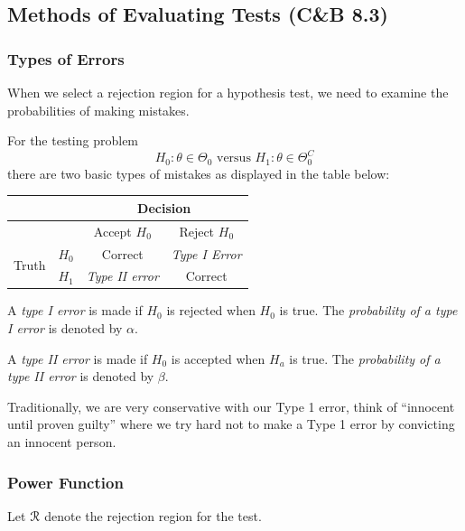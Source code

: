 \documentclass[11pt,]{article}
\def\Rsc{{\cal R}}
\begin{document}
\newpage

\hypertarget{methods-of-evaluating-tests-cb-8.3}{%
\subsection{Methods of Evaluating Tests (C\&B
8.3)}\label{methods-of-evaluating-tests-cb-8.3}}

\hypertarget{types-of-errors}{%
\subsubsection{Types of Errors}\label{types-of-errors}}

When we select a rejection region for a hypothesis test, we need to
examine the probabilities of making mistakes.

For the testing problem
\[H_0: \theta \in \Theta_0 \mbox{ versus } H_1: \theta \in \Theta_0^C\]
there are two basic types of mistakes as displayed in the table below:

\begin{tabular}{|c|c|c|c|}\hline
  \multicolumn{2}{|c|}{}  & \multicolumn{2}{c|}{Decision}  \\\hline 
  \multicolumn{2}{|c|}{}  & Accept $H_0$ & Reject $H_0$ \\\hline 
\multirow{ 2}{*}{Truth} & $H_0$ & Correct & {\em Type I Error} \\
  & $H_1$ & {\em Type II error} & Correct\\\hline
  \end{tabular}

A \emph{type I error} is made if \(H_0\) is rejected when \(H_0\) is
true. The \emph{probability of a type I error} is denoted by \(\alpha\).

A \emph{type II error} is made if \(H_0\) is accepted when \(H_a\) is
true. The \emph{probability of a type II error} is denoted by \(\beta\).

Traditionally, we are very conservative with our Type 1 error, think of
``innocent until proven guilty'' where we try hard not to make a Type 1
error by convicting an innocent person.

\hypertarget{power-function}{%
\subsubsection{Power Function}\label{power-function}}

Let \(\Rsc\) denote the rejection region for the test.
\end{document}

